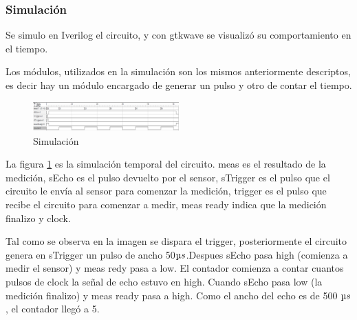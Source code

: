\documentclass[../../e3_tp2_main.tex]{subfiles}
\begin{document}
\subsubsection{Simulación}
Se simulo en Iverilog el circuito, y con gtkwave se visualizó su comportamiento en el tiempo.
\par Los módulos, utilizados en la simulación son los mismos anteriormente descriptos, es decir hay un módulo encargado de generar un pulso y otro de contar el tiempo.
\begin{figure}[H]	
	\centering
	\includegraphics[width=0.5\textwidth]{imagenes/gtksim.png}
	\caption{Simulación}\label{fig:simg}
\end{figure}

La figura \ref{fig:simg} es la simulación temporal del circuito. meas es el resultado de la medición, sEcho es el pulso devuelto por el sensor, sTrigger es el pulso que el circuito le envía al sensor para comenzar la medición, trigger es el pulso que recibe el circuito para comenzar a medir, meas ready indica que la medición finalizo y clock.
\par Tal como se observa en la imagen se dispara el trigger, posteriormente el circuito genera en sTrigger un pulso de ancho 50$\micro s$.Despues sEcho pasa high (comienza a medir el sensor) y meas redy pasa a low. El contador comienza a contar cuantos pulsos de clock la señal de echo estuvo en high. Cuando sEcho pasa low (la medición  finalizo) y meas ready pasa a high. Como el ancho del echo es de 500 $\micro s$, el contador llegó a 5.
\end{document}
